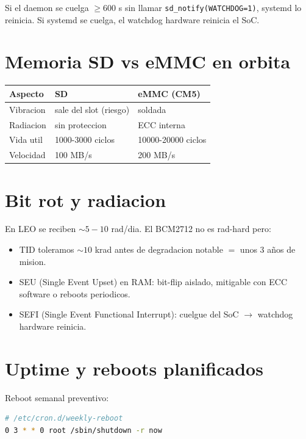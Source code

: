 \documentclass[11pt,a4paper,oneside]{report}
\begin{document}
Si el daemon se cuelga $\geq 600$ s sin llamar \texttt{sd\_notify(WATCHDOG=1)},
systemd lo reinicia. Si systemd se cuelga, el watchdog hardware reinicia el SoC.

\section{Memoria SD vs eMMC en orbita}

\begin{center}
\begin{tabular}{lll}
\toprule
\textbf{Aspecto} & \textbf{SD} & \textbf{eMMC (CM5)} \\
\midrule
Vibracion          & sale del slot (riesgo) & soldada \\
Radiacion          & sin proteccion        & ECC interna \\
Vida util          & 1000-3000 ciclos     & 10000-20000 ciclos \\
Velocidad          & 100 MB/s              & 200 MB/s \\
\bottomrule
\end{tabular}
\end{center}

\section{Bit rot y radiacion}

En LEO se reciben $\sim 5-10$ rad/dia. El BCM2712 no es rad-hard pero:

\begin{itemize}[leftmargin=2em]
  \item TID toleramos $\sim 10$ krad antes de degradacion notable $=$ unos
        3 años de mision.
  \item SEU (Single Event Upset) en RAM: bit-flip aislado, mitigable con ECC
        software o reboots periodicos.
  \item SEFI (Single Event Functional Interrupt): cuelgue del SoC $\to$
        watchdog hardware reinicia.
\end{itemize}

\section{Uptime y reboots planificados}

Reboot semanal preventivo:

\begin{lstlisting}[language=bash]
# /etc/cron.d/weekly-reboot
0 3 * * 0 root /sbin/shutdown -r now
\end{lstlisting}
\end{document}
